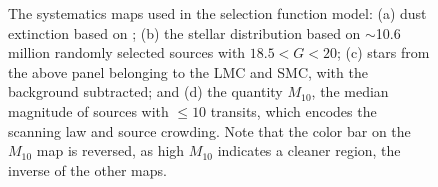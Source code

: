 \begin{figure}
    \centering

    \hspace{5ex}
    
    \hspace{5ex}    

    \caption{The systematics maps used in the selection function model: (a) dust extinction based on \cite{schlafly_measuring_2011}; (b) the stellar distribution based on $\sim$10.6 million randomly selected \Gaia sources with $18.5 < G < 20$; (c) stars from the above panel belonging to the LMC and SMC, with the background subtracted; and (d) the quantity $M_{10}$, the median magnitude of sources with $\leq10$ \Gaia transits, which encodes the scanning law and source crowding. Note that the color bar on the $M_{10}$ map is reversed, as high $M_{10}$ indicates a cleaner region, the inverse of the other maps.}
    \label{fig:systematics}
\end{figure}

